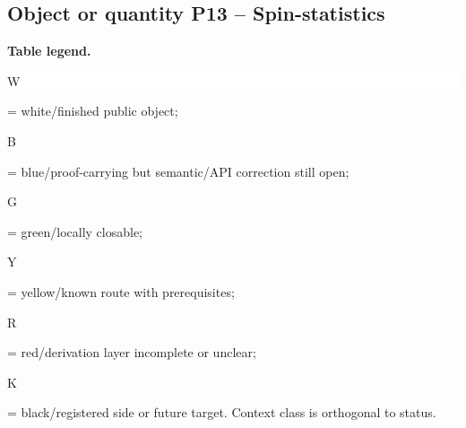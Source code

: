 \subsection*{Object or quantity P13 -- Spin-statistics}
\hypertarget{objproof:P13}{}
\par\smallskip\noindent\begin{minipage}{0.99\linewidth}\footnotesize\raggedright\textbf{Table legend.} \colorbox{white}{\strut W} = white/finished public object; \colorbox{cyan!20}{\strut B} = blue/proof-carrying but semantic/API correction still open; \colorbox{green!18}{\strut G} = green/locally closable; \colorbox{yellow!25}{\strut Y} = yellow/known route with prerequisites; \colorbox{red!20}{\strut R} = red/derivation layer incomplete or unclear; \colorbox{black!18}{\strut K} = black/registered side or future target. Context class is orthogonal to status.\end{minipage}\par\vspace{0.25em}
